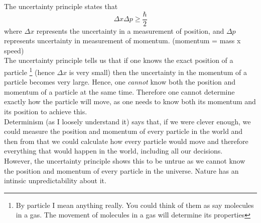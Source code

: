 \documentclass[a4paper,12pt, onecolumn]{article}
\begin{document}
  The uncertainty principle states that
  \begin{equation}
    \Delta x \Delta p \geq \frac{\hbar}{2}
   \end{equation}
  where $\Delta x$ represents the uncertainty in a measurement of position, and 
  $\Delta p$ represents uncertainty in measurement of momentum. 
  (momentum = mass x speed) \\

  The uncertainty principle tells us that if one knows the exact position of a particle
  \footnote{By particle I mean anything really. You could think of them as say molecules
    in a gas. The movement of molecules in a gas will determine its properties}
  (hence $\Delta x$ is very small) then the uncertainty in the momentum of a 
  particle becomes very large. Hence, one \emph{cannot} know both the position 
  and momentum of a particle at the same time. Therefore one cannot determine 
  exactly how the particle will move, as one needs to know both its momentum 
  and its position to achieve this. \\

  Determinism (as I loosely understand it) says that, if we were clever enough, we 
  could measure the position and momentum of every particle in the world and then from
  that we could calculate how every particle would move and therefore everything that 
  would happen in the world, including all our decisions. \\

  However, the uncertainty principle shows this to be untrue as we cannot know the 
  position and momentum of every particle in the universe. Nature has an intinsic 
  unpredictability about it.

  
\end{document}
